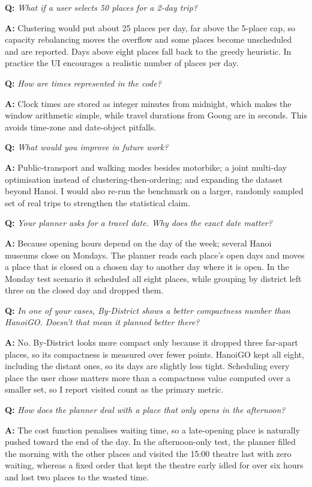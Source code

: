 \documentclass[12pt,a4paper]{article}
\newcommand{\Q}[1]{\medskip\noindent\textbf{Q:} \textit{#1}\par}
\newcommand{\A}{\noindent\textbf{A:} }
\begin{document}
\Q{What if a user selects 50 places for a 2-day trip?}
\A Clustering would put about 25 places per day, far above the 5-place cap, so
capacity rebalancing moves the overflow and some places become unscheduled and
are reported. Days above eight places fall back to the greedy heuristic. In
practice the UI encourages a realistic number of places per day.

\Q{How are times represented in the code?}
\A Clock times are stored as integer minutes from midnight, which makes the
window arithmetic simple, while travel durations from Goong are in seconds. This
avoids time-zone and date-object pitfalls.

\Q{What would you improve in future work?}
\A Public-transport and walking modes besides motorbike; a joint multi-day
optimisation instead of clustering-then-ordering; and expanding the dataset
beyond Hanoi. I would also re-run the benchmark on a larger, randomly sampled set
of real trips to strengthen the statistical claim.

\Q{Your planner asks for a travel date. Why does the exact date matter?}
\A Because opening hours depend on the day of the week; several Hanoi museums
close on Mondays. The planner reads each place's open days and moves a place that
is closed on a chosen day to another day where it is open. In the Monday test
scenario it scheduled all eight places, while grouping by district left three on
the closed day and dropped them.

\Q{In one of your cases, By-District shows a better compactness number than
HanoiGO. Doesn't that mean it planned better there?}
\A No. By-District looks more compact only because it dropped three far-apart
places, so its compactness is measured over fewer points. HanoiGO kept all eight,
including the distant ones, so its days are slightly less tight. Scheduling every
place the user chose matters more than a compactness value computed over a smaller
set, so I report visited count as the primary metric.

\Q{How does the planner deal with a place that only opens in the afternoon?}
\A The cost function penalises waiting time, so a late-opening place is naturally
pushed toward the end of the day. In the afternoon-only test, the planner filled
the morning with the other places and visited the 15:00 theatre last with zero
waiting, whereas a fixed order that kept the theatre early idled for over six
hours and lost two places to the wasted time.
\end{document}

